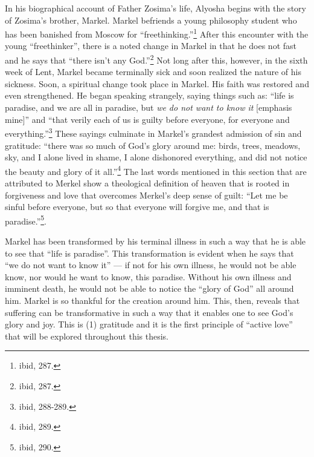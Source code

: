 	In his biographical account of Father Zosima's life, Alyosha begins with the story of Zosima's brother, Markel. Markel befriends a young philosophy student who has been banished from Moscow for ``freethinking.''\footnote{ibid, 287.} After this encounter with the young ``freethinker'', there is a noted change in Markel in that he does not fast and he says that ``there isn't any God.''\footnote{ibid, 287.} Not long after this, however, in the sixth week of Lent, Markel became terminally sick and soon realized the nature of his sickness. Soon, a spiritual change took place in Markel. His faith was restored and even strengthened. He began speaking strangely, saying things such as: ``life is paradise, and we are all in paradise, but \emph{we do not want to know it} [emphasis mine]'' and ``that verily each of us is guilty before everyone, for everyone and everything.''\footnote{ibid, 288-289.} These sayings culminate in Markel's grandest admission of sin and gratitude: ``there was so much of God's glory around me: birds, trees, meadows, sky, and I alone lived in shame, I alone dishonored everything, and did not notice the beauty and glory of it all.''\footnote{ibid, 289.} The last words mentioned in this section that are attributed to Merkel show a theological definition of heaven that is rooted in forgiveness and love that overcomes Merkel's deep sense of guilt: ``Let me be sinful before everyone, but so that everyone will forgive me, and that is paradise.''\footnote{ibid, 290.}.
	
	Markel has been transformed by his terminal illness in such a way that he is able to see that ``life is paradise''. This transformation is evident when he says that ``we do not want to know it'' --- if not for his own illness, he would not be able know, nor would he want to know, this paradise. Without his own illness and imminent death, he would not be able to notice the ``glory of God'' all around him. Markel is so thankful for the creation around him. This, then, reveals that suffering can be transformative in such a way that it enables one to see God's glory and joy. This is (1) gratitude and it is the first principle of ``active love'' that will be explored throughout this thesis.
	
